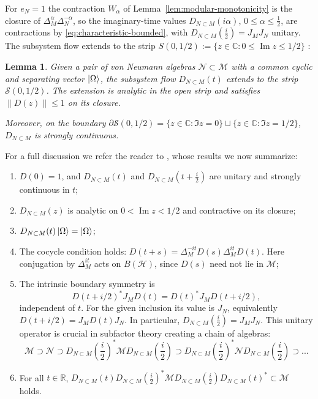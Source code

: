 \documentclass[a4paper,11pt]{article}
\newtheorem{lemma}[theorem]{Lemma}
\theoremstyle{definition}
\newcommand{\mH}{\mathcal{H}}
\begin{document}
For $e_N=1$ the contraction $W_\alpha$ of Lemma~\ref{lem:modular-monotonicity} is the closure of $\Delta_M^{\alpha}\Delta_N^{-\alpha}$, so the imaginary-time values $D_{N\subset M}(i\alpha)$, $0\le\alpha\le\tfrac12$, are contractions by \eqref{eq:characteristic-bounded}, with $D_{N\subset M}(\tfrac i2)=J_MJ_N$ unitary. The subsystem flow extends to the strip $S(0,1/2):=\{z\in\mathbb C:0\leq\operatorname{Im}z\leq1/2\}$ \cite{revolutionizing}:
\begin{lemma}
    Given a pair of von Neumann algebras $\mathcal N\subset\mathcal M$ with a common cyclic and separating vector $\ket{\Omega}$, the subsystem flow $D_{N\subset M}(t)$ extends to the strip $\mathcal{S}(0,1/2)$. The extension is analytic in the open strip and satisfies $\|D(z)\|\leq1$ on its closure.

    Moreover, on the boundary $\partial\mathcal{S}(0,1/2) = \{z\in\mathbb{C}:\Im{z} = 0\}\sqcup\{z\in\mathbb{C}:\Im{z} = 1/2\}$, $D_{N\subset M}$ is strongly continuous.
\end{lemma}
For a full discussion we refer the reader to \cite{revolutionizing}, whose results we now summarize:
\begin{enumerate}
    \item $D(0)=1$, and $D_{N\subset M}(t)$ and $D_{N\subset M}(t +\frac{i}{2})$ are unitary and strongly continuous in $t$;
    \item $D_{N\subset M}(z)$ is analytic on $0<\operatorname{Im}z<1/2$ and contractive on its closure;
    \item $D_{N\subset M}(t)\ket{\Omega} = \ket{\Omega}$;
    \item The cocycle condition holds: $D(t+s)=\Delta_M^{-it}D(s)\Delta_M^{it}D(t)$. Here conjugation by $\Delta_M^{it}$ acts on $B(\mH)$, since $D(s)$ need not lie in $\mathcal M$;
    \item The intrinsic boundary symmetry is
    \[
     D(t+i/2)^*J_M D(t)=D(t)^*J_M D(t+i/2),
    \]
    independent of $t$. For the given inclusion its value is $J_N$, equivalently
    $D(t+i/2)=J_M D(t)J_N$. In particular, $D_{N\subset M}(\frac{i}{2}) = J_MJ_N$. This unitary operator is crucial in subfactor theory creating a chain of algebras:
    \begin{equation}
        \mathcal M\supset\mathcal N\supset D_{N\subset M}(\frac{i}{2})^*\mathcal MD_{N\subset M}(\frac{i}{2})\supset D_{N\subset M}(\frac{i}{2})^*\mathcal ND_{N\subset M}(\frac{i}{2})\supset...
    \end{equation}
    \item For all $t\in\mathbb{R}$, $D_{N\subset M}(t)D_{N\subset M}(\frac{i}{2})^*\mathcal MD_{N\subset M}(\frac{i}{2})D_{N\subset M}(t)^*\subset\mathcal M$ holds.
\end{enumerate}
\end{document}
